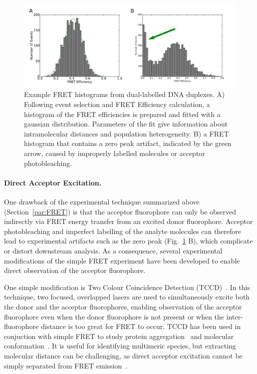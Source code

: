 \begin{figure}[!ht]
   \begin{center}
      \includegraphics*[clip=true, width=6in]{introduction/FRET_AND_zero.pdf}
      \caption{Example FRET histograms from dual-labelled DNA duplexes. A) Following event selection and FRET Efficiency calculation, a histogram of the FRET efficiencies is prepared and fitted with a gaussian distribution. Parameters of the fit give information about intramolecular distances and population heterogeneity. B) a FRET histogram that contains a zero peak artifact, indicated by the green arrow, caused by improperly labelled molecules or acceptor photobleaching.}
      \label{fig:histogram}
   \end{center}
\end{figure}

\paragraph{Direct Acceptor Excitation.}
One drawback of the experimental technique summarized above (Section~\ref{par:FRET}) is that the acceptor fluorophore can only be observed indirectly via FRET energy transfer from an excited donor fluorophore. Acceptor photobleaching and imperfect labelling of the analyte molecules can therefore lead to experimental artifacts such as the zero peak (Fig.~\ref{fig:histogram} B), which complicate or distort downstream analysis. As a consequence, several experimental modifications of the simple FRET experiment have been developed to enable direct observation of the acceptor fluorophore.

One simple modification is Two Colour Coincidence Detection (TCCD)~\cite{orte06, orte10}. In this technique, two focused, overlapped lasers are used to simultaneously excite both the donor and the acceptor fluorophores, enabling observation of the acceptor fluorophore even when the donor fluorophore is not present or when the inter-fluorophore distance is too great for FRET to occur. TCCD has been used in conjuction with simple FRET to study protein aggregation~\cite{cremades2012} and molecular conformation~\cite{Ye2012}. It is useful for identifying multimeric species, but extracting molecular distance can be challenging, as direct acceptor excitation cannot be simply separated from FRET emission~\cite{orte08_3}.  

